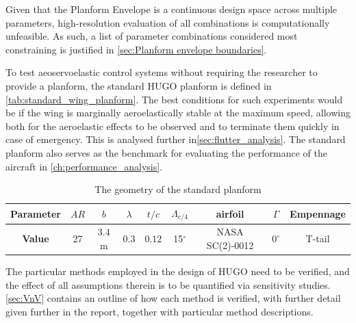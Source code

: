 Given that the Planform Envelope is a continuous design space across multiple parameters, high-resolution evaluation of all combinations is computationally unfeasible. As such, a list of parameter combinations considered most constraining is justified in \autoref{sec:Planform envelope boundaries}.

To test  aeoservoelastic control systems without requiring the researcher to provide a planform, the standard HUGO planform is defined in \autoref{tab:standard_wing_planform}. The best conditions for such experiments would be if the wing is marginally aeroelastically stable at the maximum speed, allowing both for the aeroelastic effects to be observed and to terminate them quickly in case of emergency. This is analysed further in\autoref{sec:flutter_analysis}. The standard planform also serves as the benchmark for evaluating the performance of the aircraft in \autoref{ch:performance_analysis}.

\begin{table}[H]
    \centering
    \caption{The geometry of the standard planform}
    \begin{tabular}{|c||c|c|c|c|c|c|c|c|}\hline
         \textbf{Parameter}& $AR$ & $b$ & $\lambda$& $t/c$ & $\Lambda_{c/4}$ & airfoil & $\Gamma$ & Empennage  \\\hline
         \textbf{Value} & 27 & $3.4$ m & 0.3 & $0.12$ & 15$^\circ$ & NASA SC(2)-0012 & $0^\circ$ & T-tail\\\hline
    \end{tabular}
    
    \label{tab:standard_wing_planform}
\end{table}

The particular methods employed in the design of HUGO need to be verified, and the effect of all assumptions therein is to be quantified via sensitivity studies. \autoref{sec:VnV} contains an outline of how each method is verified, with further detail given further in the report, together with particular method descriptions.






